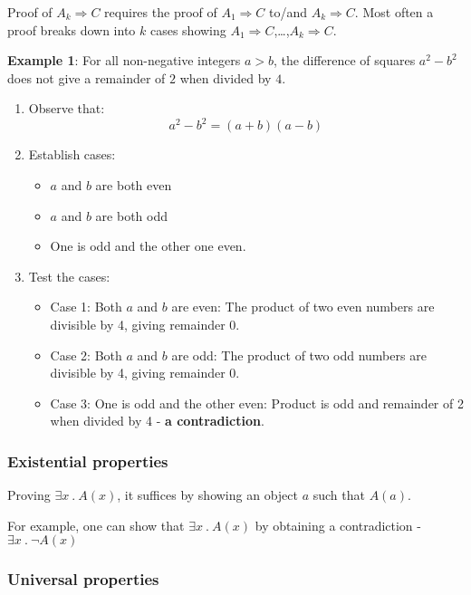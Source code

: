 \documentclass[10pt,a4paper]{article}
\begin{document}
Proof of $A_k \Rightarrow C$ requires the proof of $A_1\Rightarrow C$ to/and $A_k\Rightarrow C$.
Most often a proof breaks down into $k$ cases showing $A_1\Rightarrow C$,\dots,$A_k\Rightarrow C$.

\textbf{Example 1}: For all non-negative integers $a>b$, the difference of squares $a^2-b^2$ does
not give a remainder of $2$ when divided by $4$.
\begin{enumerate}
    \item Observe that:
    $$
        a^2-b^2 = (a+b)(a-b)
    $$
    \item Establish cases: 
    \begin{itemize}
        \item $a$ and $b$ are both even 
        \item $a$ and $b$ are both odd
        \item One is odd and the other one even.
    \end{itemize}
    \item Test the cases:
    \begin{itemize}
        \item Case 1: Both $a$ and $b$ are even: The product of two even numbers are divisible by 4,
        giving remainder 0.
        \item Case 2: Both $a$ and $b$ are odd: The product of two odd numbers are divisible by 4,
        giving remainder 0.
        \item Case 3: One is odd and the other even: Product is odd and remainder of 2 when divided
        by 4 - \textbf{a contradiction}.
    \end{itemize}
\end{enumerate} 


\subsubsection{Existential properties}

Proving $\exists x\:.\:A(x)$, it suffices by showing an object $a$ such that $A(a)$. \par 

For example, one can show that $\exists x\:.\:A(x)$ by obtaining a contradiction - $\exists x \:.\:
\neg A(x)$

\subsubsection{Universal properties}
\end{document}
